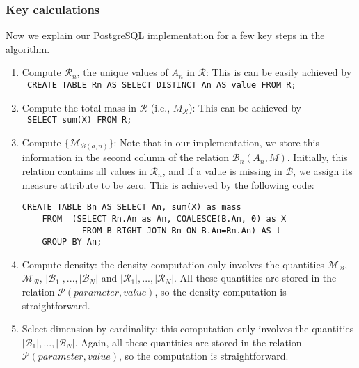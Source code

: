 \subsubsection{Key calculations}
Now we explain our PostgreSQL implementation for  a few key steps in the algorithm.

\begin{enumerate}

\item Compute $\mathcal{R}_n$, the unique values of $A_n$ in $\mathcal{R}$:
This is can be easily achieved by\\
{\tt
CREATE TABLE Rn AS SELECT DISTINCT An AS value FROM R;
}%

\item Compute the  total mass in $\mathcal{R}$ (i.e., $M_{\mathcal{R}}$): This can be achieved by\\
{\tt
SELECT sum(X) FROM R;
}

\item Compute $\{\mathcal{M}_{\mathcal{B}(a, n)}\}$: Note that in our implementation, we store this information in the second column of the relation $\mathcal{B}_n(A_n, M)$. Initially, this relation contains all values in $\mathcal{R}_n$, and if a value is missing in $\mathcal{B}$, we assign its measure attribute to be zero. This is achieved by the following code:
\begin{verbatim}
CREATE TABLE Bn AS SELECT An, sum(X) as mass 
    FROM  (SELECT Rn.An as An, COALESCE(B.An, 0) as X
            FROM B RIGHT JOIN Rn ON B.An=Rn.An) AS t 
    GROUP BY An;
\end{verbatim}

\item Compute density: the density computation only involves the quantities $\mathcal{M}_{\mathcal{B}}$, $\mathcal{M}_{\mathcal{R}}$, $|\mathcal{B}_1|, ..., |\mathcal{B}_N|$ and $|\mathcal{R}_1|, ..., |\mathcal{R}_N|$. All these quantities are stored in the relation $\mathcal{P}(parameter, value)$, so the density computation is straightforward. 

\item Select dimension by cardinality: this computation only involves the quantities $|\mathcal{B}_1|, ..., |\mathcal{B}_N|$. Again, all these quantities are stored in the relation $\mathcal{P}(parameter, value)$, so the computation is straightforward. 


\end{enumerate}
